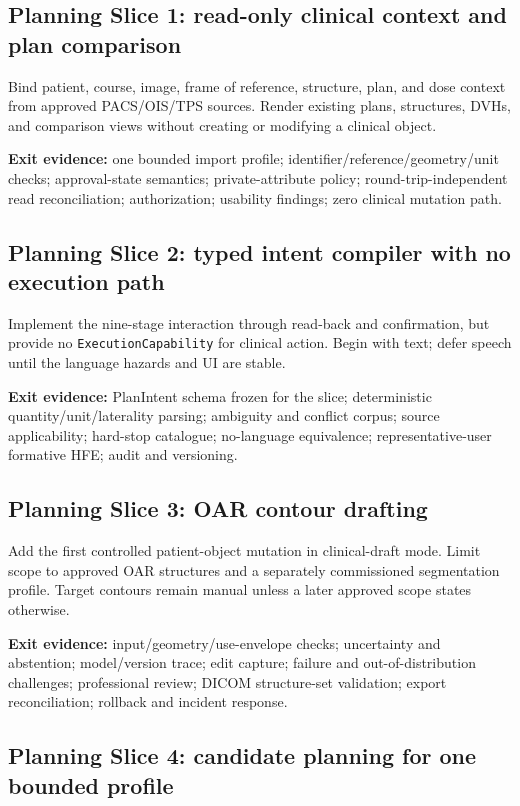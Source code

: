 \documentclass[11pt,letterpaper]{article}
\begin{document}
\subsection{Planning Slice 1: read-only clinical context and plan comparison}

Bind patient, course, image, frame of reference, structure, plan, and dose context from approved PACS/OIS/TPS sources. Render existing plans, structures, DVHs, and comparison views without creating or modifying a clinical object.

\textbf{Exit evidence:} one bounded import profile; identifier/reference/geometry/unit checks; approval-state semantics; private-attribute policy; round-trip-independent read reconciliation; authorization; usability findings; zero clinical mutation path.

\subsection{Planning Slice 2: typed intent compiler with no execution path}

Implement the nine-stage interaction through read-back and confirmation, but provide no \texttt{ExecutionCapability} for clinical action. Begin with text; defer speech until the language hazards and UI are stable.

\textbf{Exit evidence:} PlanIntent schema frozen for the slice; deterministic quantity/unit/laterality parsing; ambiguity and conflict corpus; source applicability; hard-stop catalogue; no-language equivalence; representative-user formative HFE; audit and versioning.

\subsection{Planning Slice 3: OAR contour drafting}

Add the first controlled patient-object mutation in clinical-draft mode. Limit scope to approved OAR structures and a separately commissioned segmentation profile. Target contours remain manual unless a later approved scope states otherwise.

\textbf{Exit evidence:} input/geometry/use-envelope checks; uncertainty and abstention; model/version trace; edit capture; failure and out-of-distribution challenges; professional review; DICOM structure-set validation; export reconciliation; rollback and incident response.

\subsection{Planning Slice 4: candidate planning for one bounded profile}
\end{document}
